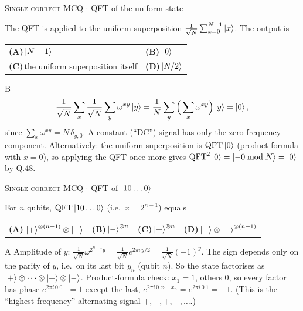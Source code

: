 \documentclass[11pt,a4paper]{article}
\newcommand{\optlabel}[1]{\textbf{(#1)}}
\newcommand{\correctlabel}[1]{\textcolor{okgreen}{\textbf{(#1)}\,\ding{51}}}
\newenvironment{qitem}[1]{\begin{list}{}{\setlength{\leftmargin}{3.3em}\setlength{\labelwidth}{3.1em}%
  \setlength{\labelsep}{0.2em}\setlength{\topsep}{3pt}\setlength{\parsep}{3pt}}\item[\textbf{Q.#1}\hfill]}{\end{list}}
\newcommand{\qsep}{\par\vspace{2pt}{\color{black!15}\hrule}\vspace{4pt}}
\newcommand{\qmeta}[2]{{\footnotesize\color{black!60}\textsc{#1} \;$\cdot$\; #2}\par}
\begin{document}
\begin{qitem}{49}
\qmeta{Single-correct MCQ}{QFT of the uniform state}
The QFT is applied to the uniform superposition $\frac{1}{\sqrt N}\sum_{x=0}^{N-1}\ket{x}$. The output is
\par\smallskip\noindent\begin{tabularx}{\linewidth}{@{}*{2}{L}@{}}
\optlabel{A}\,$\ket{N-1}$ & \correctlabel{B}\,$\ket{0}$ \\[3pt]
\optlabel{C}\,the uniform superposition itself & \optlabel{D}\,$\ket{N/2}$
\end{tabularx}
\end{qitem}
\begin{solbox}{B}
\[ \frac{1}{\sqrt N}\sum_x \frac{1}{\sqrt N}\sum_y\omega^{xy}\ket y = \frac1N\sum_y\Big(\sum_x\omega^{xy}\Big)\ket y = \ket0, \]
since $\sum_x \omega^{xy} = N\,\delta_{y,0}$. A constant (``DC'') signal has only the zero-frequency component.
Alternatively: the uniform superposition is $\mathrm{QFT}\ket0$ (product formula with $x = 0$), so applying the QFT once more gives
$\mathrm{QFT}^2\ket0 = \ket{-0 \bmod N} = \ket0$ by Q.48.
\end{solbox}
\qsep

\begin{qitem}{50}
\qmeta{Single-correct MCQ}{QFT of $\ket{10\dots0}$}
For $n$ qubits, $\mathrm{QFT}\ket{10\dots0}$ (i.e.\ $x = 2^{n-1}$) equals
\par\smallskip\noindent\begin{tabularx}{\linewidth}{@{}*{4}{L}@{}}
\correctlabel{A}\,$\ket{+}^{\otimes(n-1)}\otimes\ket{-}$ & \optlabel{B}\,$\ket{-}^{\otimes n}$ & \optlabel{C}\,$\ket{+}^{\otimes n}$ & \optlabel{D}\,$\ket{-}\otimes\ket{+}^{\otimes(n-1)}$
\end{tabularx}
\end{qitem}
\begin{solbox}{A}
Amplitude of $y$: $\frac{1}{\sqrt N}\omega^{2^{n-1}y} = \frac{1}{\sqrt N}e^{2\pi i\,y/2} = \frac{1}{\sqrt N}(-1)^{y}$. The sign depends only on
the parity of $y$, i.e.\ on its last bit $y_n$ (qubit $n$). So the state factorises as
$\ket{+}\otimes\dots\otimes\ket{+}\otimes\ket{-}$. Product-formula check: $x_1 = 1$, others $0$, so every factor has phase
$e^{2\pi i\,0.0\dots}=1$ except the last, $e^{2\pi i\,0.x_1\dots x_n} = e^{2\pi i\,0.1} = -1$. (This is the ``highest frequency''
alternating signal $+,-,+,-,\dots$.)
\end{solbox}
\qsep
\end{document}
